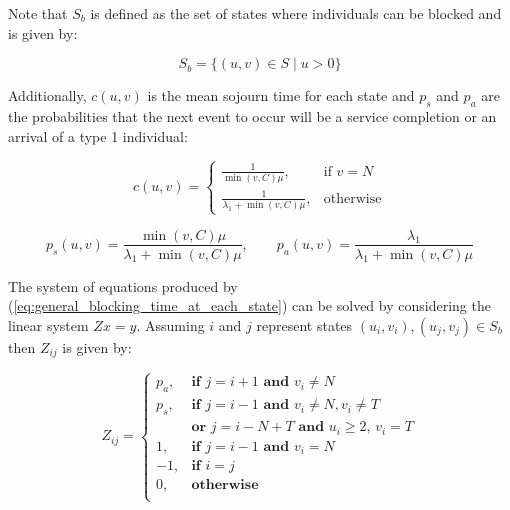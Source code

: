 Note that \(S_b\) is defined as the set of states where individuals can be
blocked and is given by:

\begin{equation} \label{eq:set_of_blocking_states}
    S_b = \{(u,v) \in S \; | \; u > 0\}
\end{equation}

Additionally, \(c(u,v)\) is the mean sojourn time for each state and \(p_s\) 
and \(p_a\) are the probabilities that the next event to occur will be a 
service completion or an arrival of a type 1 individual:

\begin{equation}\label{eq:sojourn_blocking_time}
    c(u,v) = 
    \begin{cases}
        \frac{1}{\min(v,C) \mu}, & \text{if } v = N\\
        \frac{1}{\lambda_1 + \min(v,C) \mu}, & \text{otherwise}
    \end{cases}
\end{equation}

\begin{equation}\label{eq:probs_of_service_and_arrival}
    p_s(u,v) = \frac{\min(v,C)\mu}{\lambda_1 + \min(v,C)\mu}, \qquad
    p_a(u,v) = \frac{\lambda_1}{\lambda_1 + \min(v,C)\mu}
\end{equation}

The system of equations produced by 
(\ref{eq:general_blocking_time_at_each_state}) can be solved by considering the 
linear system \(Zx=y\). 
Assuming \(i\) and \(j\) represent states \((u_i, v_i), (u_j, v_j) \in S_b\) 
then \(Z_{ij}\) is given by:

\begin{equation}\label{eq:general_mapping_function_of_blocking_matrix}
    Z_{ij} = 
    \begin{cases}
        p_a, & \textbf{if } j = i + 1 \textbf{ and } v_i \neq N \\
        p_s, & \textbf{if } j = i - 1 \textbf{ and } v_i \neq N, v_i \neq T \\
             & \textbf{or } j = i - N + T \textbf{ and } u_i \geq 2,\,v_i = T \\
        1, & \textbf{if } j = i - 1 \textbf{ and } v_i = N \\
        -1, & \textbf{if } i = j \\
        0, & \textbf{otherwise} \\
    \end{cases}
\end{equation}

